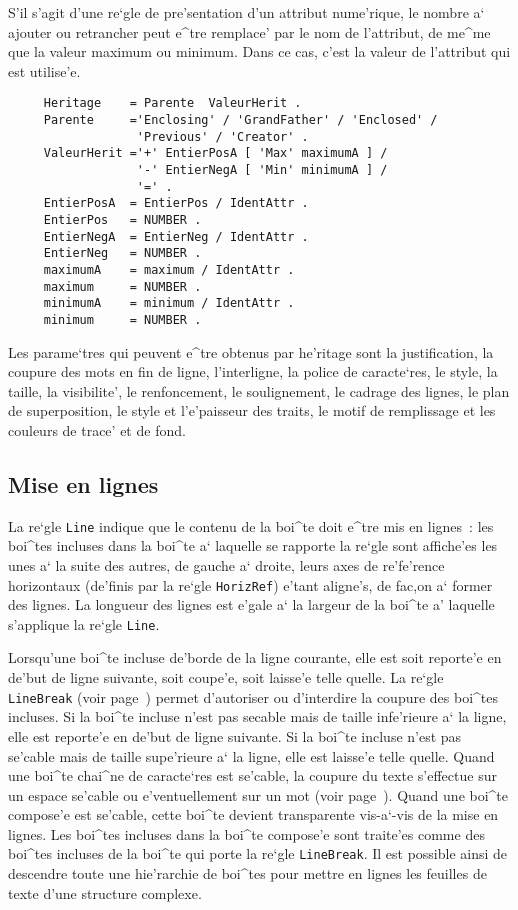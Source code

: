 {S'il s'agit d'une re`gle de pre'sentation d'un attribut nume'rique, le nombre
a` ajouter ou retrancher peut e^tre remplace' par le nom de l'attribut, de
me^me que la valeur maximum ou minimum. Dans ce cas, c'est la valeur de
l'attribut qui est utilise'e.

\begin{verbatim}
     Heritage    = Parente  ValeurHerit .
     Parente     ='Enclosing' / 'GrandFather' / 'Enclosed' /
                  'Previous' / 'Creator' .
     ValeurHerit ='+' EntierPosA [ 'Max' maximumA ] /
                  '-' EntierNegA [ 'Min' minimumA ] /
                  '=' .
     EntierPosA  = EntierPos / IdentAttr .
     EntierPos   = NUMBER .
     EntierNegA  = EntierNeg / IdentAttr .
     EntierNeg   = NUMBER .
     maximumA    = maximum / IdentAttr .
     maximum     = NUMBER .
     minimumA    = minimum / IdentAttr .
     minimum     = NUMBER .
\end{verbatim}

Les parame`tres qui peuvent e^tre obtenus par he'ritage sont la justification,
la coupure des mots en fin de ligne,
l'interligne, la police de caracte`res, le style, la taille, la visibilite',
le renfoncement, le soulignement, le cadrage des lignes, le plan de
superposition, le style et l'e'paisseur des traits, le motif de remplissage et
les couleurs de trace' et de fond.

\subsection{Mise en lignes}
\label{regleline}

La re`gle {\tt Line} indique que le contenu de la boi^te doit e^tre mis
en lignes~: les boi^tes incluses dans la boi^te a` laquelle se rapporte la
re`gle sont affiche'es les unes a` la suite des autres, de gauche a` droite,
leurs axes de re'fe'rence horizontaux (de'finis par la re`gle {\tt HorizRef})
e'tant aligne's, de fac,on a` former des lignes. La longueur des lignes est
e'gale a` la largeur de la boi^te a' laquelle s'applique la re`gle {\tt Line}.

Lorsqu'une boi^te incluse de'borde de la ligne courante, elle est soit reporte'e
en de'but de ligne suivante, soit coupe'e, soit laisse'e telle quelle.
La re`gle {\tt LineBreak} (voir page~\pageref{condcoupure}) permet d'autoriser
ou d'interdire la coupure des boi^tes incluses.
Si la boi^te incluse n'est pas secable mais de taille infe'rieure a` la ligne,
elle est reporte'e en de'but de ligne suivante.
Si la boi^te incluse n'est pas se'cable mais de taille supe'rieure a` la ligne,
elle est laisse'e telle quelle.
Quand une boi^te chai^ne de caracte`res est se'cable, la coupure du texte
s'effectue sur un espace se'cable ou e'ventuellement sur un mot
(voir page~\pageref{reglehyphenate}).
Quand une boi^te compose'e est se'cable, cette boi^te devient transparente
vis-a`-vis de la mise en lignes.
Les boi^tes incluses dans la boi^te compose'e sont traite'es comme des
boi^tes incluses de la boi^te qui porte la re`gle {\tt LineBreak}.
Il est possible ainsi de descendre toute une hie'rarchie de boi^tes pour mettre
en lignes les feuilles de texte d'une structure complexe.

}

